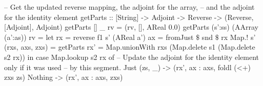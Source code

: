 \begin{haskell}[caption=Reverse pass over a vectorized fold, label=lst:assign_foldv, gobble=16]
                        -- Get the updated reverse mapping, the adjoint for the array,
                        -- and the adjoint for the identity element
                        getParts :: [String] -> Adjoint -> Reverse 
                            -> (Reverse, [Adjoint], Adjoint)
                        getParts []      _                rv = (rv, [], AReal 0.0)
                        getParts (s':ss) (AArray (a':as)) rv =
                            let rx = reverse f1 s' (AReal a')
                                ax = fromJust $\$$ snd $\$$ rx Map.! s'
                                (rxs, axs, zxs) = getParts
                                rx' = Map.unionWith rxs (Map.delete s1 (Map.delete s2 rx))
                            in  case Map.lookup s2 rx of
                                -- Update the adjoint for the identity element only if it was used
                                -- by this segment.
                                Just (zs, _) -> (rx', ax : axs, foldl (<+) zxs zs)
                                Nothing      -> (rx', ax : axs, zxs)
            \end{haskell}

